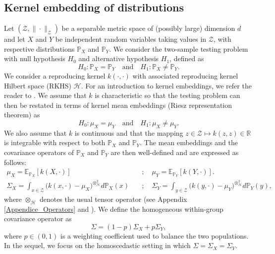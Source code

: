 \documentclass[twoside,11pt]{article}
\newcommand{\Hk}{\mathcal{H}}
\newcommand{\PP}{\mathbb{P}}%
\newcommand{\EE}{\mathbb{E}}%
\renewcommand{\P}{\mathbb{P}}
\begin{document}
\subsection{Kernel embedding of distributions}
Let $\left(\mathcal{Z},\|\cdot\|_{\mathcal{Z}}\right)$ be a separable metric space of (possibly large) dimension $d$ and let $X$ and $Y$ be independent random variables taking values in $\mathcal{Z}$, with respective distributions $\mathbb{P}_X$ and $\mathbb{P}_Y$. We consider the two-sample testing problem with null hypothesis $H_0$ and alternative hypothesis $H_1$, defined as
\begin{equation}
H_0 : {\mathbb{P}_X = \mathbb{P}_Y}
\quad \text{and} \quad
H_1 : {\mathbb{P}_X \neq \mathbb{P}_Y}.
\label{non_parametric_test}
\end{equation}
We consider a reproducing kernel $k(\cdot,\cdot)$ with associated reproducing kernel Hilbert space (RKHS) $\Hk$. For an introduction to kernel embeddings, we refer the reader to \cite{muandet2017kernel}. 
We assume that $k$ is characteristic so that the testing problem can then be restated in terms of kernel mean embeddings (Riesz representation theorem) as
\begin{equation}
H_0 : {\mu_X = \mu_Y}
\quad \text{and} \quad
H_1 : {\mu_X \neq \mu_Y}.
\label{kernel_test}
\end{equation}
We also assume that $k$ is continuous and that the mapping $z \in \mathcal{Z} \mapsto k(z,z) \in \mathbb{R}$ is integrable with respect to both $\mathbb{P}_X$ and $\mathbb{P}_Y$. The mean embeddings and the covariance operators of $\mathbb{P}_X$ and $\mathbb{P}_Y$ are then well-defined and are expressed as follows:
\begin{align*}
	\mu_X = \EE_{\PP_X}[k(X,\cdot)] \quad &; \quad \mu_Y = \EE_{\PP_Y}[k(Y,\cdot)]. \\
    \Sigma_{X} = \int_{x \in \mathcal{Z}} \Big( k(x,\cdot) - \mu_X \Big)^{\otimes^2_{\Hk}}  d\P_X(x) \quad &; \quad     \Sigma_{Y} = \int_{y \in \mathcal{Z}} \Big( k(y,\cdot) - \mu_Y \Big)^{\otimes^2_{\Hk}} d\P_Y(y),
\end{align*}
where $\otimes_{\Hk}$ denotes the usual tensor operator (see Appendix \ref{Appendice_Operators} and \cite{muandet2017kernel}). We define the homogeneous within-group covariance operator as 
\begin{equation}
\Sigma = (1-p)\Sigma_X + p\Sigma_Y,
\label{within_covariance_operator}
\end{equation}
where $p \in (0,1)$ is a weighting coefficient used to balance the two populations. In the sequel, we focus on the homoscedastic setting in which $\Sigma = \Sigma_X = \Sigma_Y$.
\end{document}
